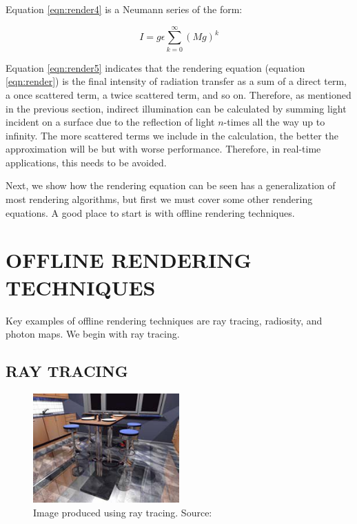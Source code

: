 Equation \ref{eqn:render4} is a Neumann series of the form:

\begin{equation}
I = g\epsilon\sum_{k=0}^{\infty}(Mg)^k \label{eqn:render5}
\end{equation}

Equation \ref{eqn:render5} indicates that the rendering equation (equation \ref{eqn:render}) is the final intensity of radiation transfer as a sum of a direct term, a once scattered term, a twice scattered term, and so on.  Therefore, as mentioned in the previous section, indirect illumination can be calculated by summing light incident on a surface due to the reflection of light $n$-times all the way up to infinity.  The more scattered terms we include in the calculation, the better the approximation will be but with worse performance.  Therefore, in real-time applications, this needs to be avoided.  

Next, we show how the rendering equation can be seen has a generalization of most rendering algorithms, but first we must cover some other rendering equations.  A good place to start is with offline rendering techniques.

\section{OFFLINE RENDERING TECHNIQUES}
Key examples of offline rendering techniques are ray tracing, radiosity, and photon maps.  We begin with ray tracing.

\subsection{RAY TRACING}

\begin{figure}[h!]
  \centering
    \includegraphics[width=0.5\textwidth]{raytraceSample.jpg}
  \caption{Image produced using ray tracing. Source: \protect\cite{Wald2003}}
	\label{fig:raytraceSample}
\end{figure}


